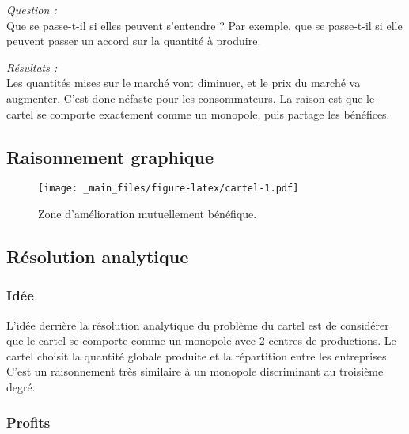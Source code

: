 \documentclass[
  a4paper,
]{book}
\theoremstyle{definition}
\theoremstyle{definition}
\theoremstyle{definition}
\theoremstyle{definition}
\theoremstyle{remark}
\begin{document}
\emph{Question :}\\
Que se passe-t-il si elles peuvent s'entendre ?
Par exemple, que se passe-t-il si elle peuvent passer un accord sur la quantité à produire.

\emph{Résultats :}\\
Les quantités mises sur le marché vont diminuer, et le prix du marché va augmenter.
C'est donc néfaste pour les consommateurs.
La raison est que le cartel se comporte exactement comme un monopole, puis partage les bénéfices.

\hypertarget{raisonnement-graphique}{%
\subsection{Raisonnement graphique}\label{raisonnement-graphique}}

\begin{figure}
\centering
\texttt{[image: \_main\_files/figure-latex/cartel-1.pdf]}
\caption{\label{fig:cartel}Zone d'amélioration mutuellement bénéfique.}
\end{figure}

\hypertarget{ruxe9solution-analytique}{%
\subsection{Résolution analytique}\label{ruxe9solution-analytique}}

\hypertarget{iduxe9e}{%
\subsubsection{Idée}\label{iduxe9e}}

L'idée derrière la résolution analytique du problème du cartel est de considérer que le cartel se comporte comme un monopole avec 2 centres de productions.
Le cartel choisit la quantité globale produite et la répartition entre les entreprises.
C'est un raisonnement très similaire à un monopole discriminant au troisième degré.

\hypertarget{profits-2}{%
\subsubsection{Profits}\label{profits-2}}
\end{document}
